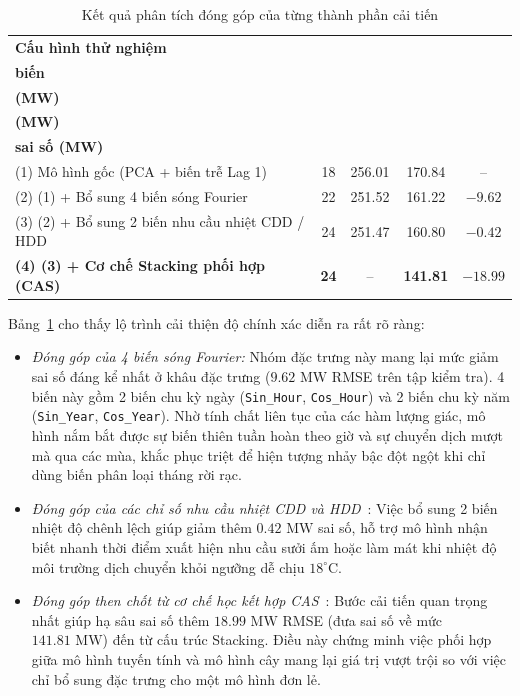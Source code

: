 \begin{table}[H]
\centering
\small
\caption{Kết quả phân tích đóng góp của từng thành phần cải tiến}
\label{tab:ablation_study}
\setlength{\tabcolsep}{8pt}
\renewcommand{\arraystretch}{1.15}
\begin{tabularx}{\linewidth}{@{} X c c c c @{}}
\toprule
\textbf{Cấu hình thử nghiệm} & \makecell{\textbf{Số}\\\textbf{biến}} & \makecell{\textbf{CV RMSE}\\\textbf{(MW)}} & \makecell{\textbf{Test RMSE}\\\textbf{(MW)}} & \makecell{\textbf{Mức giảm}\\\textbf{sai số (MW)}} \\
\midrule
(1) Mô hình gốc (PCA + biến trễ Lag 1) & 18 & 256.01 & 170.84 & -- \\
(2) (1) + Bổ sung 4 biến sóng Fourier & 22 & 251.52 & 161.22 & $-9.62$ \\
(3) (2) + Bổ sung 2 biến nhu cầu nhiệt CDD / HDD~\cite{quayle1980heating} & 24 & 251.47 & 160.80 & $-0.42$ \\
\midrule
\textbf{(4) (3) + Cơ chế Stacking phối hợp (CAS)~\cite{wolpert1992stacked}} & \textbf{24} & -- & \textbf{141.81} & \textbf{$-18.99$} \\
\bottomrule
\end{tabularx}
\end{table}

Bảng~\ref{tab:ablation_study} cho thấy lộ trình cải thiện độ chính xác diễn ra rất rõ ràng:
\begin{itemize}
    \item \textit{Đóng góp của 4 biến sóng Fourier:} Nhóm đặc trưng này mang lại mức giảm sai số đáng kể nhất ở khâu đặc trưng ($9.62\text{ MW}$ RMSE trên tập kiểm tra). 4 biến này gồm 2 biến chu kỳ ngày (\texttt{Sin\_Hour}, \texttt{Cos\_Hour}) và 2 biến chu kỳ năm (\texttt{Sin\_Year}, \texttt{Cos\_Year}). Nhờ tính chất liên tục của các hàm lượng giác, mô hình nắm bắt được sự biến thiên tuần hoàn theo giờ và sự chuyển dịch mượt mà qua các mùa, khắc phục triệt để hiện tượng nhảy bậc đột ngột khi chỉ dùng biến phân loại tháng rời rạc.
    \item \textit{Đóng góp của các chỉ số nhu cầu nhiệt CDD và HDD}~\cite{quayle1980heating}: Việc bổ sung 2 biến nhiệt độ chênh lệch giúp giảm thêm $0.42\text{ MW}$ sai số, hỗ trợ mô hình nhận biết nhanh thời điểm xuất hiện nhu cầu sưởi ấm hoặc làm mát khi nhiệt độ môi trường dịch chuyển khỏi ngưỡng dễ chịu $18^\circ\text{C}$.
    \item \textit{Đóng góp then chốt từ cơ chế học kết hợp CAS}~\cite{wolpert1992stacked}: Bước cải tiến quan trọng nhất giúp hạ sâu sai số thêm $18.99\text{ MW}$ RMSE (đưa sai số về mức $141.81\text{ MW}$) đến từ cấu trúc Stacking. Điều này chứng minh việc phối hợp giữa mô hình tuyến tính và mô hình cây mang lại giá trị vượt trội so với việc chỉ bổ sung đặc trưng cho một mô hình đơn lẻ.
\end{itemize}

